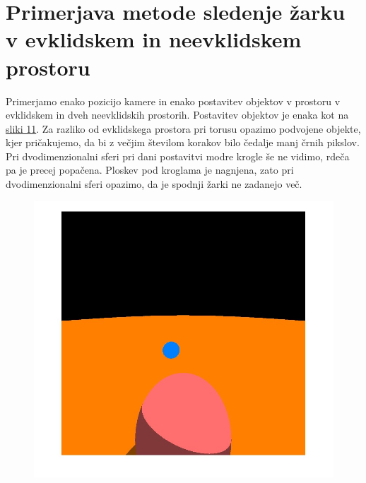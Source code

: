 \documentclass[titlepage]{article}
\begin{document}
\section{Primerjava metode sledenje žarku v evklidskem in neevklidskem prostoru}
Primerjamo enako pozicijo kamere in enako postavitev objektov v prostoru v evklidskem in dveh neevklidskih prostorih. Postavitev objektov je enaka kot
na \hyperref[fig:2sphRays2]{sliki 11}. Za razliko od evklidskega prostora pri torusu opazimo podvojene objekte, kjer pričakujemo, da bi z večjim številom korakov bilo čedalje manj črnih pikslov. Pri dvodimenzionalni sferi pri dani postavitvi modre krogle še ne vidimo, rdeča pa je precej popačena. Ploskev pod kroglama je nagnjena, zato pri dvodimenzionalni sferi opazimo, da je spodnji žarki ne zadanejo več.
\begin{figure}[H]
\centering
\begin{minipage}{.33\textwidth}
  \centering
  \includegraphics[width=1\linewidth]{Images/Euclidean.jpg}
  \label{fig:2sphRend}
\end{minipage}%
\begin{minipage}{.33\textwidth}
  \centering

\end{minipage}
\end{figure}
\end{document}
